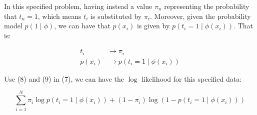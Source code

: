 \documentclass[twoside,11pt]{homework}
\begin{document}
In this specified problem, having instead a value $\pi_n$ representing the probability that $t_n=1$, which means $t_i$ is substituted by $\pi_i$. Moreover, given the probability model $p(1 \mid \phi)$, we can have that $p(x_i)$ is given by $p(t_i =1 \mid \phi(x_i))$. That is:

	\begin{align}
	t_i  &\longrightarrow \pi_i\\
	p(x_i) &\longrightarrow p(t_i =1 \mid \phi(x_i))
	\end{align}

Use (8) and (9) in (7), we can have the $\log$ likelihood for this specified data:

$$
\sum_{i=1}^{N} \pi_i\log p(t_i =1 \mid \phi(x_i)) + (1-\pi_i) \log (1-p(t_i =1 \mid \phi(x_i)))
$$
\end{document}

